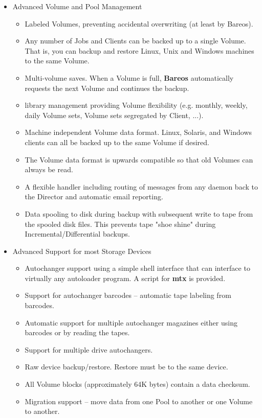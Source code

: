 \begin{itemize}
\item Advanced Volume and Pool Management
   \begin{itemize}
   \item Labeled Volumes, preventing accidental overwriting  (at least by
      Bareos).
   \item Any number of Jobs and Clients can be backed up to a single  Volume.
      That is, you can backup and restore Linux, Unix and  Windows machines to
      the same Volume.
   \item Multi-volume saves. When a Volume is full, {\bf Bareos}  automatically
      requests the next Volume and continues the backup.
   \item
       library management
      providing Volume flexibility (e.g. monthly, weekly, daily Volume sets,  Volume
      sets segregated by Client, ...).
   \item Machine independent Volume data format. Linux, Solaris, and Windows
      clients can all be backed up to the same Volume if desired.
   \item The Volume data format is upwards compatible so that old Volumes
      can always be read.
   \item A flexible
        handler including routing
      of messages from any daemon back to the  Director and automatic email
      reporting.
   \item Data spooling to disk during backup with subsequent write to tape from
      the spooled disk files. This prevents tape "shoe shine"  during
      Incremental/Differential backups.
   \end{itemize}

\item Advanced Support for most Storage Devices
    \begin{itemize}
   \item Autochanger support using a simple shell interface that can interface
      to virtually any autoloader program. A script for {\bf mtx} is  provided.
   \item Support for autochanger barcodes -- automatic tape labeling from
      barcodes.
   \item Automatic support for multiple autochanger magazines either using
      barcodes or by reading the tapes.
   \item Support for multiple drive autochangers.
   \item Raw device backup/restore. Restore must be to the same device.
   \item All Volume blocks (approximately 64K bytes) contain a data checksum.
   \item Migration support -- move data from one Pool to another or
         one Volume to another.
   \end{itemize}


\end{itemize}
